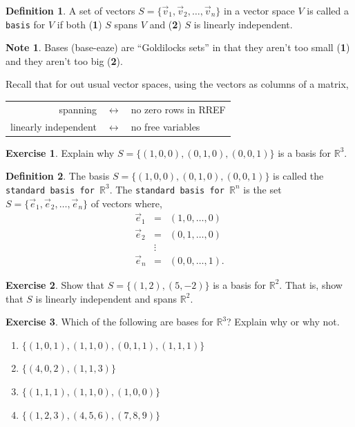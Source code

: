 \documentclass{beamer}
\newcommand{\R}{\mathbb{R}}
\newcommand{\fn}{\insertframenumber}
\theoremstyle{definition}
\newtheorem{exercise}{Exercise}
\newtheorem*{defn}{Definition}
\newtheorem*{nb}{Note}
\renewcommand{\emph}[1]{{\color{blue}\texttt{#1}}}
\begin{document}
\begin{frame}{\fn}
	\begin{defn}
		A set of vectors $S=\{\vec v_1,\vec v_2,\dots,\vec v_n\}$ in a vector space $V$ is called a \emph{basis} for $V$ if both (\textbf{1}) $S$ spans $V$ and (\textbf{2}) $S$ is linearly independent.
	\end{defn}
	\begin{nb}
		Bases (base-eaze) are ``Goldilocks sets'' in that they aren't too small (\textbf{1}) and they aren't too big (\textbf{2}).
		
		Recall that for out usual vector spaces, using the vectors as columns of a matrix,
		\begin{center}
			\begin{tabular}{rcl} 
				spanning &$\longleftrightarrow$& no zero rows in RREF\\
				linearly independent &$\longleftrightarrow$& no free variables
			\end{tabular}
		\end{center}
	\end{nb}
\end{frame}
\begin{frame}{\fn}
	\begin{exercise}
		Explain why $S=\{(1,0,0),(0,1,0),(0,0,1)\}$ is a basis for $\R^3$. 
	\end{exercise}
	\begin{defn}
		The basis $S=\{(1,0,0),(0,1,0),(0,0,1)\}$ is called the \emph{standard basis for $\R^3$}.  The \emph{standard basis for $\R^n$} is the set $S=\{\vec e_1,\vec e_2,\dots,\vec e_n\}$ of vectors where,
		$$\begin{array}{rcl}
		\vec e_1&=&(1,0,\dots,0)\\
		\vec e_2 &=&(0,1,\dots,0)\\
		&\vdots\\
		\vec e_n&=&(0,0,\dots,1).
		\end{array}$$
	\end{defn}
\end{frame}
\begin{frame}{\fn}
	\begin{exercise}\label{exercise:basisforR2}
		Show that $S=\{(1,2),(5,-2)\}$ is a basis for $\R^2$. That is, show that $S$ is linearly independent and spans $\R^2$.
	\end{exercise}
	\begin{exercise}
		Which of the following are bases for $\R^3$? Explain why or why not.
		\begin{enumerate}[label=(\alph*)]
			\item $\{(1,0,1),(1,1,0),(0,1,1),(1,1,1)\}$
			\item $\{(4,0,2),(1,1,3)\}$
			\item $\{(1,1,1),(1,1,0),(1,0,0)\}$
			\item $\{(1,2,3),(4,5,6),(7,8,9)\}$
		\end{enumerate}
	\end{exercise}
\end{frame}
\end{document}
